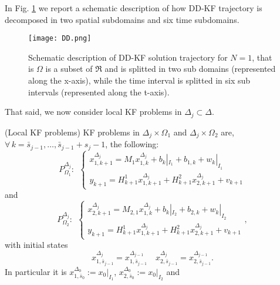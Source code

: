 \documentclass[smallcondensed]{svjour3}
\begin{document}
\noindent In Fig. \ref{fig_DD} we report a schematic description of how  DD-KF trajectory is decomposed  in two spatial subdomains and six time subdomains. 
\begin{center}
\begin{figure}[h!]
{\texttt{[image: DD.png]}}
\caption{Schematic description of DD-KF solution trajectory for $N=1$, that is $\Omega $ is a subset of $\Re$ and is splitted in two sub domains (represented along the x-axis), while the time interval   is splitted in six sub intervals (represented along the t-axis).}
\label{fig_DD}
\end{figure}
\end{center}
\noindent That said, we now consider local KF problems in  $\Delta_{j}\subset \Delta$.  \\
\noindent \begin{definition}
(Local KF problems)
\noindent KF problems in  $\Delta_{j} \times \Omega_1$ and $\Delta_{j} \times \Omega_2$ are, $\forall \, k=\bar{s}_{j-1},\ldots,\bar{s}_{j-1}+s_{j}-1$, the following:
\begin{equation}\label{subproblemsp1}
P_{\Omega_{1}}^{\Delta_{j}}: \ \ \left\{ \begin{array}{ll}
 x_{1,k+1}^{\Delta_{j}}=M_{1}x_{1,k}^{\Delta_{j}}+b_{k}|_{I_{1}}+b_{1,k}+w_{k}|_{I_{1}}\\
y_{k+1}=H_{k+1}^{1}{x}_{1,k+1}^{\Delta_{j}}+H_{k+1}^{2}{x}_{2,k+1}^{\Delta_{j}}+v_{k+1}
\end{array}\right. 
\end{equation}
and 
\begin{equation}\label{subproblemsp2}
P_{\Omega_{2}}^{\Delta_{j}}: \ \             \left\{ \begin{array}{ll}
x_{2,k+1}^{\Delta_{j}}=M_{2,1}x_{1,k}^{\Delta_{j}}+b_{k}|_{I_{2}}+b_{2,k}+w_{k}|_{I_{2}}\\
y_{k+1}=H_{k+1}^{1}{x}_{1,k+1}^{\Delta_{j}}+H_{k+1}^{2}{x}_{2,k+1}^{\Delta_{j}}+v_{k+1}
\end{array}, \right.
\end{equation}
with initial states 
\begin{equation}\label{initial_states}
x_{1,\bar{s}_{j-1}}^{\Delta_{j}}=x_{1,\bar{s}_{j-1}}^{\Delta_{j-1}}\quad  x_{2,\bar{s}_{j-1}}^{\Delta_{j}}=x_{2,\bar{s}_{j-1}}^{\Delta_{j-1}}.
\end{equation}
In particular it is $x_{1,\bar{s}_{0}}^{\Delta_{0}}:=x_{0}|_{I_{1}}$, $x_{2,\bar{s}_{0}}^{\Delta_{0}}:=x_{0}|_{I_{2}}$ and  
\begin{equation}

\end{equation}
\end{definition}
\end{document}
